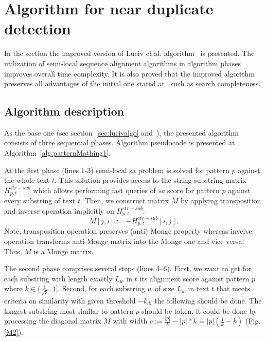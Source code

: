 \section{Algorithm for near duplicate detection}
\label{section:luciv}

In the section the improved version of Luciv et.al. algorithm~\cite{luciv2019interactive} is presented.
The utilization of semi-local sequence alignment algorithms in algorithm phases improves overall time complexity.
It is also proved that the improved algorithm preserves all advantages of the initial one stated at~\cite{luciv2019interactive} such as search completeness.

\subsection{Algorithm description}
As the base one (see section~\ref{sec:lucivalgo} and~\cite{luciv2019interactive}), the presented algorithm consists of three sequential phases.
Algorithm pseudocode is presented at Algorithm~\ref{alg:patternMathing1}.

At the first phase (lines 1-3) semi-local sa problem is solved for pattern $p$ against the whole text $t$.
This solution provides access to the string-substring matrix $H^{str-sub}_{p,t}$ which allows performing fast queries of \emph{sa} score for pattern $p$ against every substring of text $t$.
Then, we construct matrix $M$ by applying transposition and inverse operation implicitly on $H^{str-sub}_{p,t}$:
$$M[j,i]:= -H^{str-sub}_{p,t}[i,j].$$
Note, transposition operation preserves (anti) Monge property whereas inverse operation transforms anti-Monge matrix into the Monge one and vice versa. 
Thus, $M$ is a Monge matrix.

The second phase comprises several steps (lines 4--6).
First, we want to get for each substring with length exactly $L_{w}$ in  $t$ its alignment score against pattern $p$ where $k \in (\frac{1}{\sqrt{3}},1]$.
Second, for each substring $w$ of size $L_{w}$ in text $t$ that meets criteria on similarity with given threshold $-k_{di}$ the following should be done.
The longest substring  most similar to pattern $p$ should be taken.
it could be done by processing the diagonal 
matrix $M$ with width $c:= \frac{|p|}{k} - |p|*k = |p|(\frac{1}{k} - k)$ (Fig. \ref{M2}).

